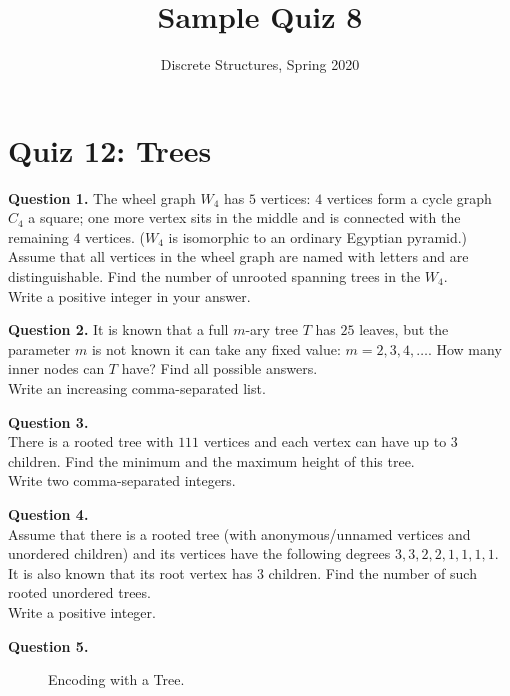 \documentclass[jou]{apa6}
\title{Sample Quiz 8}
\author{Discrete Structures, Spring 2020}
\affiliation{RBS}
\begin{document}

\twocolumn
\section{Quiz 12: Trees}

{\bf Question 1.} The wheel graph $W_4$ has $5$ vertices: 
$4$ vertices form a cycle graph $C_4$ \textendash{} a square; 
one more vertex sits in the middle and is connected with the remaining $4$ vertices. 
($W_4$ is isomorphic to an ordinary Egyptian pyramid.) 
Assume that all vertices in the wheel graph are named with letters and are distinguishable. 
Find the number of unrooted spanning trees in the $W_4$.\\
Write a positive integer in your answer.

\vspace{10pt}
{\bf Question 2.} It is known that a full $m$-ary tree $T$ has $25$ leaves, but the parameter $m$ is 
not known \textendash{} it can take any fixed value: $m = 2,3,4,\ldots$. 
How many inner nodes can $T$ have? Find all possible answers.\\
Write an increasing comma-separated list.

\vspace{10pt}
{\bf Question 3.}\\ There is a rooted tree with $111$ vertices and each vertex can have up to $3$ children. 
Find the minimum and the maximum height of this tree.\\
Write two comma-separated integers.


\vspace{10pt}
{\bf Question 4.}\\ 
Assume that there is a rooted tree (with anonymous/unnamed vertices and unordered children) and its vertices have 
the following degrees $3, 3, 2, 2, 1, 1, 1, 1$. It is also known that its root vertex has $3$ children. 
Find the number of such rooted unordered trees.\\
Write a positive integer.


\vspace{10pt}
{\bf Question 5.}

\begin{figure}[!htb]
\caption{\label{fig:huffman-tree} Encoding with a Tree.}
\end{figure}
\end{document}
